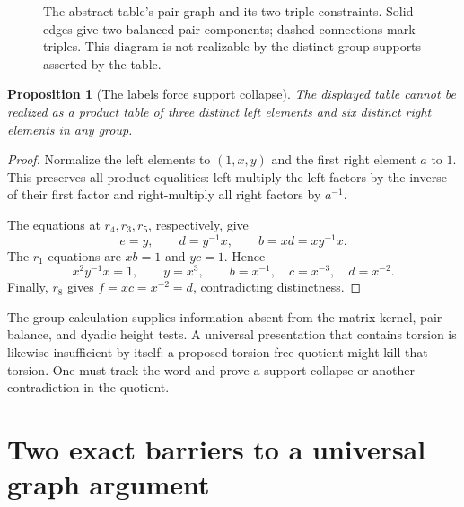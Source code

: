 \documentclass[11pt,a4paper,oneside]{report}
\newtheorem{proposition}[theorem]{Proposition}
\theoremstyle{definition}
\theoremstyle{remark}
\begin{document}
\begin{figure}[htbp]
\centering
{}
\caption{The abstract table's pair graph and its two triple constraints. Solid edges give two balanced pair components; dashed connections mark triples. This diagram is not realizable by the distinct group supports asserted by the table.}
\end{figure}
\begin{proposition}[The labels force support collapse]\label{M02:prop:collapse}
The displayed table cannot be realized as a product table of three distinct left elements and six distinct right elements in any group.
\end{proposition}
\begin{proof}
Normalize the left elements to \((1,x,y)\) and the first right element \(a\) to \(1\). This preserves all product equalities: left-multiply the left factors by the inverse of their first factor and right-multiply all right factors by \(a^{-1}\).

The equations at \(r_4,r_3,r_5\), respectively, give
\[
e=y,\qquad d=y^{-1}x,\qquad b=xd=xy^{-1}x.
\]
The \(r_1\) equations are \(xb=1\) and \(yc=1\). Hence
\[
x^2y^{-1}x=1,\qquad y=x^3,\qquad
b=x^{-1},\quad c=x^{-3},\quad d=x^{-2}.
\]
Finally, \(r_8\) gives \(f=xc=x^{-2}=d\), contradicting distinctness.
\end{proof}
The group calculation supplies information absent from the matrix kernel, pair balance, and dyadic height tests. A universal presentation that contains torsion is likewise insufficient by itself: a proposed torsion-free quotient might kill that torsion. One must track the word and prove a support collapse or another contradiction in the quotient.

\section{Two exact barriers to a universal graph argument}\label{M02:sec:barriers}
\end{document}
